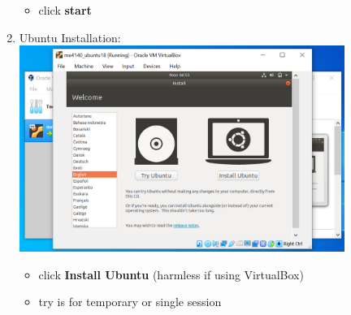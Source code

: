\documentclass[12pt]{article}
\begin{document}
\begin{description}
\begin{description}
\begin{enumerate}[label=\alph*)]
\begin{itemize}
                 \item click {\bf start}

            \end{itemize}

\newpage
\item Ubuntu Installation: \vspace{5mm} \\
      		\hspace*{-2.5cm}\includegraphics[scale=.6]{Capture13.png} 
            \begin{itemize}
               
                 \item click {\bf Install Ubuntu} (harmless if using VirtualBox)
                 \item try is for temporary or single session
                   

\end{itemize}
\end{enumerate}
\end{description}
\end{description}
\end{document}

